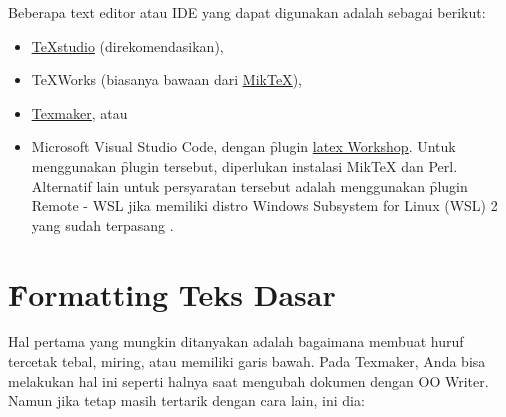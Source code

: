 Beberapa text editor atau IDE yang dapat digunakan adalah sebagai berikut:
\begin{itemize}
	\item \underline{\href{https://www.texstudio.org/}{TeXstudio}} (direkomendasikan),
	\item TeXWorks (biasanya bawaan dari \underline{\href{https://miktex.org/download}{MikTeX}}),
	\item \underline{\href{http://www.xm1math.net/texmaker/}{Texmaker}}, atau
	\item Microsoft Visual Studio Code, dengan \f{plugin} \underline{\href{https://marketplace.visualstudio.com/items?itemName=James-Yu.latex-workshop}{\gls{latex} Workshop}}.
	Untuk menggunakan \f{plugin} tersebut, diperlukan instalasi MikTeX dan Perl.
	Alternatif lain untuk persyaratan tersebut adalah menggunakan \f{plugin} Remote - WSL jika memiliki distro Windows Subsystem for Linux (WSL) 2 yang sudah terpasang .
\end{itemize}


\section{\f{Formatting} Teks Dasar}
\label{sec:latexBasicFormatting}
Hal pertama yang mungkin ditanyakan adalah bagaimana membuat huruf tercetak tebal, miring, atau memiliki garis bawah.
Pada Texmaker, Anda bisa melakukan hal ini seperti halnya saat mengubah dokumen dengan OO Writer.
Namun jika tetap masih tertarik dengan cara lain, ini dia:

